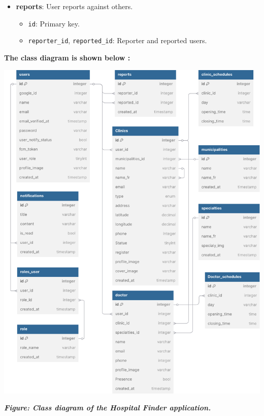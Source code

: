 \documentclass[12pt]{report}
\begin{document}
\begin{itemize}
	\item \textbf{reports}: User reports against others.
	      \begin{itemize}
		      \item \texttt{id}: Primary key.
		      \item \texttt{reporter\_id}, \texttt{reported\_id}: Reporter and reported users.
	      \end{itemize}

\end{itemize}

\vspace{4cm}
\begin{center}
	\textbf{ The class diagram is shown below : }
\end{center}
\begin{center}
	\hspace*{-1cm}\includegraphics[width=1.1\textwidth]{images/dbclass.pdf}
\end{center}
\vspace{0.5cm}
\begin{center}
	\textit{\textbf{Figure: Class diagram of the Hospital Finder application.}}

\end{center}
\vspace{0.5cm}
\end{document}
